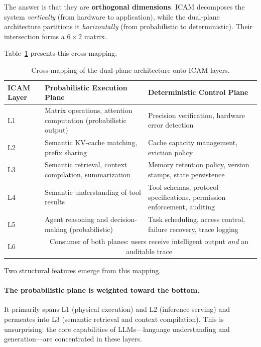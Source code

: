 \documentclass[11pt,a4paper]{article}
\begin{document}
The answer is that they are \textbf{orthogonal dimensions}. ICAM decomposes the system \textit{vertically} (from hardware to application), while the dual-plane architecture partitions it \textit{horizontally} (from probabilistic to deterministic). Their intersection forms a $6 \times 2$ matrix.

Table~\ref{tab:dual-plane-icam} presents this cross-mapping.

\begin{table}[t]
\centering
\footnotesize
\caption{Cross-mapping of the dual-plane architecture onto ICAM layers.}
\label{tab:dual-plane-icam}
\begin{tabularx}{\textwidth}{p{}p{}p{}}
\toprule
ICAM Layer & Probabilistic Execution Plane & Deterministic Control Plane \\
\midrule
L1 & Matrix operations, attention computation (probabilistic output) & Precision verification, hardware error detection \\
L2 & Semantic KV-cache matching, prefix sharing & Cache capacity management, eviction policy \\
L3 & Semantic retrieval, context compilation, summarization & Memory retention policy, version stamps, state persistence \\
L4 & Semantic understanding of tool results & Tool schemas, protocol specifications, permission enforcement, auditing \\
L5 & Agent reasoning and decision-making (probabilistic) & Task scheduling, access control, failure recovery, trace logging \\
L6 & \multicolumn{2}{c}{Consumer of both planes: users receive intelligent output \textit{and} an auditable trace} \\
\bottomrule
\end{tabularx}
\end{table}

Two structural features emerge from this mapping.

\paragraph{The probabilistic plane is weighted toward the bottom.}
It primarily spans L1 (physical execution) and L2 (inference serving) and permeates into L3 (semantic retrieval and context compilation). This is unsurprising: the core capabilities of LLMs---language understanding and generation---are concentrated in these layers.
\end{document}
